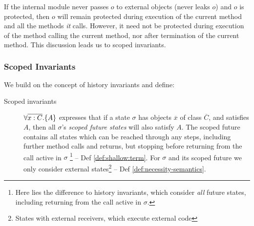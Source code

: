 If the  internal module  never passes $o$ to  external objects (\ie never leaks $o$) and  $o$ is protected, then $o$ will remain protected during execution of the current method and all the methods \emph{it} calls.
However, it need not be protected during execution of the method calling the current method, nor after termination of the current method.   
This discussion leads us to  scoped invariants.

\subsubsection{Scoped Invariants}

\label{sect:approach:scoped}
We build on the concept of history invariants \cite{liskov94behavioral,usinghistory,Cohen10} and define:

\begin{description}
\item[{Scoped invariants}]  
{$\forall {\overline{x:C}}.{{\{}}{A}{{\}}}$} expresses that if a {state} $\sigma$ 
 has objects $\overline x$ of class $\overline C$, and satisfies $A$, then all $\sigma$'s \emph{scoped  future  states} will  {also} satisfy  {$A$}. 
The scoped future contains all  states which can be reached through any steps, including further method calls and returns, but stopping before returning  from the call active in $\sigma$ \footnote{{Here lies the difference to history invariants, which consider \emph{all} future states, including returning from the call active in $\sigma$.}}  --  \cf Def  \ref{def:shallow:term}.
{For} $\sigma$ and its scoped future   we only consider external states\footnote{States with external receivers, \ie which execute external code} -- \cf Def \ref{def:necessity-semantics}.
\end{description}


